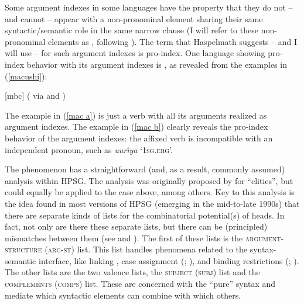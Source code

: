 \documentclass[output=paper
 	        ,biblatex
                ,babelshorthands
                ,newtxmath
                ,draftmode
                ,colorlinks, citecolor=brown
]{langscibook}
\begin{document}
\largerpage[2]
Some argument indexes in some languages have the property that they do not -- and cannot -- appear
with a non-pronominal element sharing their same syntactic/semantic role in the same narrow clause
(I will refer to these non-pronominal elements as \emph{}, following \citealt[]{haspelmath13}). The term that Haspelmath suggests -- and I will use -- for such argument indexes is pro-index. One language showing pro-index behavior with its argument indexes is , as revealed from the examples in (\ref{macushi}): 
%
\begin{samepage}
\begin{exe}
\ex \label{macushi}  [mbc] (\citealt[]{abbott91} via \citealt[]{siewierska99} and \citealt[]{corbett03}) \nolistbreak
\begin{xlist}
\end{xlist}
\end{exe}
\end{samepage}
The example in (\ref{mac a}) is just a verb with all its arguments realized as argument indexes. The example in (\ref{mac b}) clearly reveals the pro-index behavior of the argument indexes: the affixed verb is incompatible with an independent pronoun, such as \textit{uur\^{\i}ya} `\textsc{1sg.erg}'. 

\largerpage[2]
The  phenomenon has a straightforward (and, as a result, commonly assumed) analysis within HPSG. The analysis was originally proposed by \citet{MS97a-u} for  ``clitics'', but could equally be applied to the  case above, among others. Key to this analysis is the idea found in most versions of HPSG (emerging in the mid-to-late 1990s) that there are separate kinds of lists for the combinatorial potential(s) of heads. In fact, not only are there these separate lists, but there can be (principled) mismatches between them (see  and ). The first of these lists is the \textsc{argument-structure} (\textsc{arg-st}) list. This list handles phenomena related to the syntax-semantic interface, like linking \citep{Davis2001a-u}, case assignment (\citealt{Meurers99b,Prze99b}; ), and binding restrictions (\citealt{mannsag98,wecharka98}; ). The other lists are the two valence lists, the \textsc{subject} (\textsc{subj}) list and the \textsc{complements} (\textsc{comps}) list. These are concerned with the ``pure'' syntax and mediate which syntactic elements can combine with which others.
\end{document}

